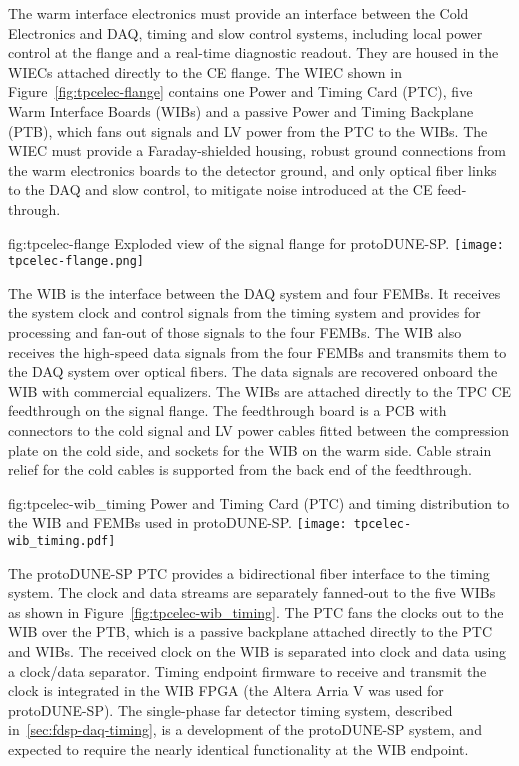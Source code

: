 
The warm interface electronics must provide an interface between the Cold Electronics and DAQ, timing and slow control systems, including local power control at the flange and a real-time diagnostic readout. They are housed in the WIECs attached directly to the CE flange.  The WIEC shown in Figure~\ref{fig:tpcelec-flange} 
contains one
Power and Timing Card (PTC), five Warm Interface Boards (WIBs) and a passive
Power and Timing Backplane (PTB), which fans out signals and LV power from the PTC to the WIBs. The WIEC must provide a Faraday-shielded housing, robust ground connections from the warm electronics boards to the detector ground, and only optical fiber links to the DAQ and slow control, to mitigate noise introduced at the CE feed-through.

\begin{dunefigure}
{fig:tpcelec-flange}
{Exploded view of the signal flange for protoDUNE-SP.}
\texttt{[image: tpcelec-flange.png]}
\end{dunefigure}

The WIB is the interface between the
DAQ system and four
FEMBs. It receives the system clock and control signals from the
timing system and provides for processing and fan-out of those signals to the four
FEMBs. The WIB also receives the high-speed data signals from the four 
FEMBs and transmits them to the DAQ system over optical
fibers. The data signals are recovered onboard the WIB with commercial equalizers.
The WIBs are attached directly to the TPC
CE feedthrough on the signal flange. The feedthrough
board is a PCB with connectors to the cold signal and LV power cables fitted
between the compression plate on the cold side, and sockets for
the WIB on the warm side. Cable strain relief for the cold cables is 
supported from the back end of the feedthrough.

\begin{dunefigure}
{fig:tpcelec-wib_timing}
{Power and Timing Card (PTC) and timing distribution to the WIB and FEMBs used in protoDUNE-SP.}
\texttt{[image: tpcelec-wib\_timing.pdf]}
\end{dunefigure}

The protoDUNE-SP PTC provides a bidirectional fiber interface to the
timing system. The clock and data
streams are separately fanned-out to the five WIBs as shown in
Figure~\ref{fig:tpcelec-wib_timing}. The PTC fans the clocks out to the WIB over the
PTB, which is a passive backplane attached directly to the PTC and
WIBs.  The received clock on the WIB is separated into clock and
data using a clock/data separator. Timing endpoint firmware to receive and transmit
the clock is integrated in the WIB FPGA (the Altera Arria V was used for protoDUNE-SP).
The single-phase far detector timing system, described in~\ref{sec:fdsp-daq-timing}, is a development of the protoDUNE-SP system, and expected to require the nearly identical functionality at the WIB endpoint.

